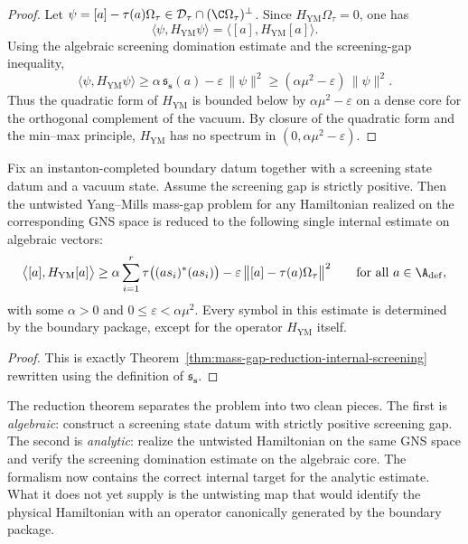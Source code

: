 \begin{proof}
Let $\psi=[a]-\tau(a)\Omega_\tau\in \mathcal D_\tau\cap (\C\Omega_\tau)^{\perp}$.
Since $H_{\mathrm{YM}}\Omega_\tau=0$, one has
\[
\langle \psi,H_{\mathrm{YM}}\psi\rangle = \langle [a],H_{\mathrm{YM}}[a]\rangle.
\]
Using the algebraic screening domination estimate and the screening-gap inequality,
\[
\langle \psi,H_{\mathrm{YM}}\psi\rangle
\ge
\alpha\,\mathfrak s_{\mathbf s}(a)-\varepsilon\,\|\psi\|^2
\ge
(\alpha\mu^2-\varepsilon)\,\|\psi\|^2.
\]
Thus the quadratic form of $H_{\mathrm{YM}}$ is bounded below by $\alpha\mu^2-\varepsilon$ on a dense core
for the orthogonal complement of the vacuum.
By closure of the quadratic form and the min--max principle,
$H_{\mathrm{YM}}$ has no spectrum in $(0,\alpha\mu^2-\varepsilon)$.
\end{proof}

\begin{corollary}
\label{cor:exact-reduction-screening-estimate}
Fix an instanton-completed boundary datum together with a screening state datum and a vacuum state.
Assume the screening gap is strictly positive.
Then the untwisted Yang--Mills mass-gap problem for any Hamiltonian realized on the corresponding GNS space
is reduced to the following single internal estimate on algebraic vectors:
\[
\bigl\langle [a],H_{\mathrm{YM}}[a]\bigr\rangle
\ge
\alpha\sum_{i=1}^r \tau\bigl((a s_i)^*(a s_i)\bigr)
-\varepsilon\,\bigl\|[a]-\tau(a)\Omega_\tau\bigr\|^2
\qquad\text{for all }a\in \A_{\mathrm{def}},
\]
with some $\alpha>0$ and $0\le \varepsilon<\alpha\mu^2$.
Every symbol in this estimate is determined by the boundary package, except for the operator
$H_{\mathrm{YM}}$ itself.
\end{corollary}

\begin{proof}
This is exactly Theorem~\ref{thm:mass-gap-reduction-internal-screening} rewritten using the definition of
$\mathfrak s_{\mathbf s}$.
\end{proof}

\begin{remark}
\label{rem:remaining-frontier-after-reduction}
The reduction theorem separates the problem into two clean pieces.
The first is \emph{algebraic}: construct a screening state datum with strictly positive screening gap.
The second is \emph{analytic}: realize the untwisted Hamiltonian on the same GNS space and verify the
screening domination estimate on the algebraic core.
The formalism now contains the correct internal target for the analytic estimate.
What it does not yet supply is the untwisting map that would identify the physical Hamiltonian with an operator
canonically generated by the boundary package.
\end{remark}
